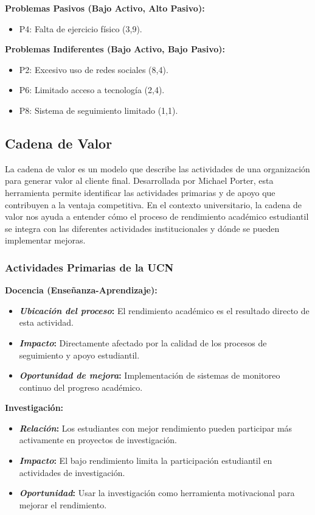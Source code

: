 \documentclass[12pt,letterpaper]{report}
\begin{document}
\textbf{Problemas Pasivos (Bajo Activo, Alto Pasivo):}
\begin{itemize}
    \item P4: Falta de ejercicio físico (3,9).
\end{itemize}

\textbf{Problemas Indiferentes (Bajo Activo, Bajo Pasivo):}
\begin{itemize}
    \item P2: Excesivo uso de redes sociales (8,4).
    \item P6: Limitado acceso a tecnología (2,4).
    \item P8: Sistema de seguimiento limitado (1,1).
\end{itemize}

\subsection{Cadena de Valor}

La cadena de valor es un modelo que describe las actividades de una organización para generar valor al cliente final. Desarrollada por Michael Porter, esta herramienta permite identificar las actividades primarias y de apoyo que contribuyen a la ventaja competitiva. En el contexto universitario, la cadena de valor nos ayuda a entender cómo el proceso de rendimiento académico estudiantil se integra con las diferentes actividades institucionales y dónde se pueden implementar mejoras.

\subsubsection{Actividades Primarias de la UCN}

\textbf{Docencia (Enseñanza-Aprendizaje):}
\begin{itemize}
    \item \textbf{\textit{Ubicación del proceso}:} El rendimiento académico es el resultado directo de esta actividad.
    \item \textbf{\textit{Impacto}:} Directamente afectado por la calidad de los procesos de seguimiento y apoyo estudiantil.
    \item \textbf{\textit{Oportunidad de mejora}:} Implementación de sistemas de monitoreo continuo del progreso académico.
\end{itemize}

\textbf{Investigación:}
\begin{itemize}
    \item \textbf{\textit{Relación}:} Los estudiantes con mejor rendimiento pueden participar más activamente en proyectos de investigación.
    \item \textbf{\textit{Impacto}:} El bajo rendimiento limita la participación estudiantil en actividades de investigación.
    \item \textbf{\textit{Oportunidad}:} Usar la investigación como herramienta motivacional para mejorar el rendimiento.
\end{itemize}
\end{document}
